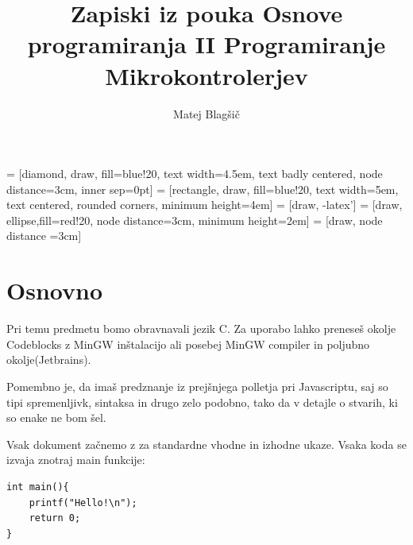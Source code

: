 \documentclass[a4paper, 12pt]{article}
\title{Zapiski iz pouka Osnove programiranja II Programiranje Mikrokontrolerjev}
\author{Matej Blagšič}
\begin{document}
 = [diamond, draw, fill=blue!20, 
text width=4.5em, text badly centered, node distance=3cm, inner sep=0pt]
 = [rectangle, draw, fill=blue!20, 
text width=5em, text centered, rounded corners, minimum height=4em]
 = [draw, -latex']
 = [draw, ellipse,fill=red!20, node distance=3cm,
minimum height=2em]
 = [draw, node distance =3cm]

\maketitle
\thispagestyle{empty}
\pagebreak
\setcounter{page}{1}

\tableofcontents
\pagebreak



\section{Osnovno}

Pri temu predmetu bomo obravnavali jezik C. Za uporabo lahko preneseš okolje Codeblocks z MinGW inštalacijo ali posebej MinGW compiler in poljubno okolje(Jetbrains).\

Pomembno je, da imaš predznanje iz prejšnjega polletja pri Javascriptu, saj so tipi spremenljivk, sintaksa in drugo zelo podobno, tako da v detajle o stvarih, ki so enake ne bom šel.\



Vsak dokument začnemo z  za standardne vhodne in izhodne ukaze.
Vsaka koda se izvaja znotraj main funkcije:


\begin{lstlisting}
int main(){
    printf("Hello!\n");
    return 0;
}
\end{lstlisting}
\end{document}
